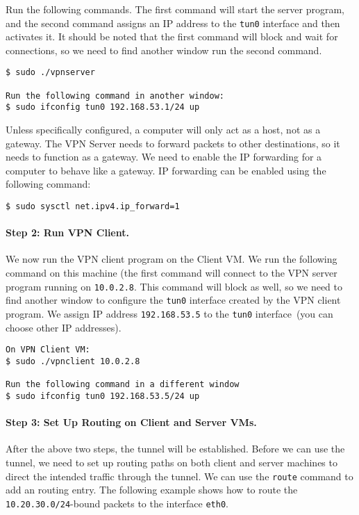 Run the following commands. The first command will start the server
program, and the second command assigns an IP address to the \texttt{tun0}
interface and then activates it. It should be noted that the first
command will block and wait for connections,
so we need to find another window run the second command.


\begin{lstlisting}
$ sudo ./vpnserver

Run the following command in another window:
$ sudo ifconfig tun0 192.168.53.1/24 up
\end{lstlisting}

Unless specifically configured, a computer will only act as a host,
not as a gateway. The VPN Server needs to forward packets to other destinations,
so it needs to function as a gateway. We need to
enable the IP forwarding for a computer to behave like a gateway.
IP forwarding can be enabled
using the following command:

\begin{lstlisting}
$ sudo sysctl net.ipv4.ip_forward=1
\end{lstlisting}



\paragraph{Step 2: Run VPN Client.} 
We now run the VPN client program on the Client
VM.  We run the following command on this machine (the first command
will connect to the VPN server program running on {\tt 10.0.2.8}.
This command will block as well, so we need to find another window to
configure the \texttt{tun0} interface created by the VPN client program.
We assign IP address \texttt{192.168.53.5} to the \texttt{tun0} interface~(you
can choose other IP addresses).


\begin{lstlisting}
On VPN Client VM:
$ sudo ./vpnclient 10.0.2.8

Run the following command in a different window
$ sudo ifconfig tun0 192.168.53.5/24 up
\end{lstlisting}



\paragraph{Step 3: Set Up Routing on Client and Server VMs.}
After the above two steps, the tunnel will be established.
Before we can use the tunnel, we need to set up routing
paths on both client and server machines to direct the intended traffic through
the tunnel. 
We can use the \texttt{route} command to add an routing entry. The
following example shows how to route the \texttt{10.20.30.0/24}-bound
packets to the interface \texttt{eth0}.

